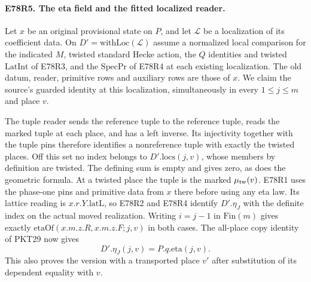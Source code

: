 \paragraph{E78R5. The eta field and the fitted localized reader.}
Let $x$ be an original provisional state on $P$, and let
$\mathcal L$ be a localization of its coefficient data. On
$D'=\mathrm{withLoc}(\mathcal L)$ assume a normalized local comparison
for the indicated $M$, twisted standard Hecke action, the $Q$ identities
and twisted $\mathrm{LatInt}$ of E78R3, and the $\mathrm{SpecPr}$
of E78R4 at each existing localization. The old datum, reader,
primitive rows and auxiliary rows are those of $x$. We claim the
source's guarded identity at this localization, simultaneously in
every $1\leq j\leq m$ and place $v$.

The tuple reader sends the reference tuple to the reference tuple,
reads the marked tuple at each place, and has a left inverse.
Its injectivity together with the tuple pins therefore identifies a
nonreference tuple with exactly the twisted places. Off this set no
index belongs to $D'.\mathrm{locs}(j,v)$, whose members by definition
are twisted. The defining sum is empty and gives zero, as does the
geometric formula. At a twisted place the tuple is the marked
$\mu_{\rm tw}(v)$. E78R1 uses the phase-one pins and primitive data
from $x$ there before using any eta law. Its lattice reading is
$x.r.Y.\mathrm{latL}$, so E78R2 and E78R4 identify $D'.\eta_J$
with the definite index on the actual moved realization. Writing
$i=j-1$ in $\mathrm{Fin}(m)$ gives exactly
$\mathrm{etaOf}(x.m.z.R,x.m.z.F;j,v)$ in both cases. The all-place
copy identity of PKT29 now gives
\[
 D'.\eta_J(j,v)=P.q.\mathrm{eta}(j,v).
\]
This also proves the version with a transported place $v'$ after
substitution of its dependent equality with $v$.

